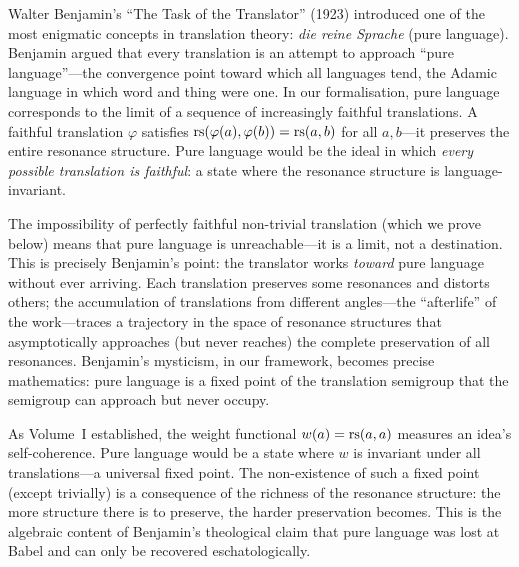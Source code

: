 \begin{interpretation}
\label{interp:benjamin-pure-language}
Walter Benjamin's ``The Task of the Translator'' (1923) introduced one of the most enigmatic concepts in translation theory: \emph{die reine Sprache} (pure language).  Benjamin argued that every translation is an attempt to approach ``pure language''---the convergence point toward which all languages tend, the Adamic language in which word and thing were one.  In our formalisation, pure language corresponds to the limit of a sequence of increasingly faithful translations.  A faithful translation $\varphi$ satisfies $\mathrm{rs}(\varphi(a), \varphi(b)) = \mathrm{rs}(a, b)$ for all $a, b$---it preserves the entire resonance structure.  Pure language would be the ideal in which \emph{every possible translation is faithful}: a state where the resonance structure is language-invariant.

The impossibility of perfectly faithful non-trivial translation (which we prove below) means that pure language is unreachable---it is a limit, not a destination.  This is precisely Benjamin's point: the translator works \emph{toward} pure language without ever arriving.  Each translation preserves some resonances and distorts others; the accumulation of translations from different angles---the ``afterlife'' of the work---traces a trajectory in the space of resonance structures that asymptotically approaches (but never reaches) the complete preservation of all resonances.  Benjamin's mysticism, in our framework, becomes precise mathematics: pure language is a fixed point of the translation semigroup that the semigroup can approach but never occupy.

As Volume~I established, the weight functional $w(a) = \mathrm{rs}(a, a)$ measures an idea's self-coherence.  Pure language would be a state where $w$ is invariant under all translations---a universal fixed point.  The non-existence of such a fixed point (except trivially) is a consequence of the richness of the resonance structure: the more structure there is to preserve, the harder preservation becomes.  This is the algebraic content of Benjamin's theological claim that pure language was lost at Babel and can only be recovered eschatologically.
\end{interpretation}

